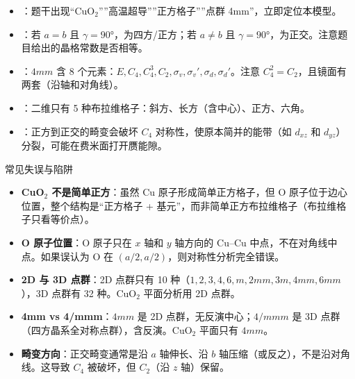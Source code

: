 \begin{tipbox}[快速识别与解题技巧]
\begin{itemize}
    \item {}：题干出现``CuO$_2$''''高温超导''''正方格子''''点群 4mm''，立即定位本模型。
    \item {}：若 $a=b$ 且 $\gamma=90°$，为四方/正方；若 $a\neq b$ 且 $\gamma=90°$，为正交。注意题目给出的晶格常数是否相等。
    \item {}：$4mm$ 含 8 个元素：$E, C_4, C_4^3, C_2, \sigma_v, \sigma_v', \sigma_d, \sigma_d'$。注意 $C_4^2=C_2$，且镜面有两套（沿轴和对角线）。
    \item {}：二维只有 5 种布拉维格子：斜方、长方（含中心）、正方、六角。
    \item {}：正方到正交的畸变会破坏 $C_4$ 对称性，使原本简并的能带（如 $d_{xz}$ 和 $d_{yz}$）分裂，可能在费米面打开赝能隙。
\end{itemize}
\end{tipbox}

\begin{errorbox}{常见失误与陷阱}
\begin{itemize}
    \item \textbf{CuO$_2$ 不是简单正方}：虽然 Cu 原子形成简单正方格子，但 O 原子位于边心位置，整个结构是``正方格子 + 基元''，而非简单正方布拉维格子（布拉维格子只看等价点）。
    \item \textbf{O 原子位置}：O 原子只在 $x$ 轴和 $y$ 轴方向的 Cu--Cu 中点，不在对角线中点。如果误认为 O 在 $(a/2,a/2)$，则对称性分析完全错误。
    \item \textbf{2D 与 3D 点群}：2D 点群只有 10 种（$1,2,3,4,6,m,2mm,3m,4mm,6mm$），3D 点群有 32 种。CuO$_2$ 平面分析用 2D 点群。
    \item \textbf{4mm vs 4/mmm}：$4mm$ 是 2D 点群，无反演中心；$4/mmm$ 是 3D 点群（四方晶系全对称点群），含反演。CuO$_2$ 平面只有 $4mm$。
    \item \textbf{畸变方向}：正交畸变通常是沿 $a$ 轴伸长、沿 $b$ 轴压缩（或反之），不是沿对角线。这导致 $C_4$ 被破坏，但 $C_2$（沿 $z$ 轴）保留。
\end{itemize}
\end{errorbox}

